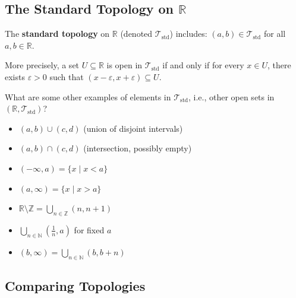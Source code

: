 \documentclass[11pt]{report}
\begin{document}
\subsection{The Standard Topology on $\mathbb{R}$}

\begin{exbox}
The \textbf{standard topology} on $\mathbb{R}$ (denoted $\mathcal{T}_{\text{std}}$) includes: $(a,b) \in \mathcal{T}_{\text{std}}$ for all $a, b \in \mathbb{R}$.

More precisely, a set $U \subseteq \mathbb{R}$ is open in $\mathcal{T}_{\text{std}}$ if and only if for every $x \in U$, there exists $\varepsilon > 0$ such that $(x - \varepsilon, x + \varepsilon) \subseteq U$.
\end{exbox}

\begin{questbox}
What are some other examples of elements in $\mathcal{T}_{\text{std}}$, i.e., other open sets in $(\mathbb{R}, \mathcal{T}_{\text{std}})$?
\end{questbox}

\begin{exbox}
\begin{itemize}
    \item $(a,b) \cup (c,d)$ \quad (union of disjoint intervals)
    \item $(a,b) \cap (c,d)$ \quad (intersection, possibly empty)
    \item $(-\infty, a) = \{x \mid x < a\}$
    \item $(a, \infty) = \{x \mid x > a\}$
    \item $\mathbb{R} \setminus \mathbb{Z} = \bigcup_{n \in \mathbb{Z}} (n, n+1)$
    \item $\bigcup_{n \in \mathbb{N}} \left(\frac{1}{n}, a\right)$ for fixed $a$
    \item $(b, \infty) = \bigcup_{n \in \mathbb{N}} (b, b + n)$
\end{itemize}
\end{exbox}

\subsection{Comparing Topologies}
\end{document}
